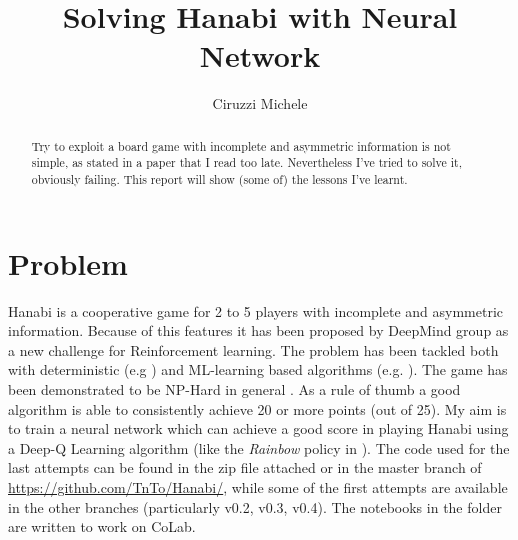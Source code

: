 \documentclass[]{article}
\title{Solving Hanabi with Neural Network}
\author{Ciruzzi Michele}
\begin{document}
\maketitle

\begin{abstract}
	Try to exploit a board game with incomplete and asymmetric information is not simple, as stated in a paper \cite{BARD2020103216} that I read too late. Nevertheless I've tried to solve it, obviously failing. This report will show (some of) the lessons I've learnt. 
\end{abstract}

\section{Problem}
Hanabi is a cooperative game for 2 to 5 players with incomplete and asymmetric information.
Because of this features it has been proposed by DeepMind group \parencite{BARD2020103216} as a new challenge for Reinforcement learning.
The problem has been tackled both with deterministic (e.g \cite{Cox2015}) and ML-learning based algorithms (e.g. \cite{Lerer2019}).
The game has been demonstrated to be NP-Hard in general \parencite{Baffier2016}.
As a rule of thumb a good algorithm is able to consistently achieve 20 or more points (out of 25).
My aim is to train a neural network which can achieve a good score in playing Hanabi using a Deep-Q Learning algorithm \cite{Mnih2015} (like the \textit{Rainbow} policy in \cite{BARD2020103216}).
The code used for the last attempts can be found in the zip file attached or in the master branch of \url{https://github.com/TnTo/Hanabi/}, while some of the first attempts are available in the other branches (particularly v0.2, v0.3, v0.4). The notebooks in the folder are written to work on CoLab.

\end{document}
